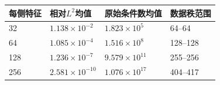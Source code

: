 \begin{tabular}{llll}\toprule
每侧特征 & 相对$L^2$均值 & 原始条件数均值 & 数据秩范围 \\ \midrule
32 & $1.138\times10^{-2}$ & $1.823\times10^{5}$ & 64--64 \\
64 & $1.085\times10^{-4}$ & $1.516\times10^{8}$ & 128--128 \\
128 & $1.236\times10^{-7}$ & $9.579\times10^{11}$ & 255--256 \\
256 & $2.581\times10^{-10}$ & $1.076\times10^{17}$ & 404--417 \\
\bottomrule\end{tabular}
